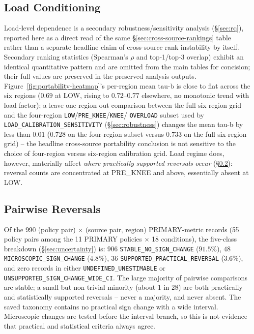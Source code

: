 \subsection{Load Conditioning}
\label{sec:load-conditioning}

Load-level dependence is a secondary robustness/sensitivity analysis
(\S\ref{sec:rq}), reported here as a direct read of the same
\S\ref{sec:cross-source-rankings} table rather than a separate headline
claim of cross-source rank instability by itself. Secondary ranking statistics (Spearman's $\rho$ and top-1/top-3 overlap) exhibit an identical quantitative pattern and are omitted from the main tables for concision; their full values are preserved in the preserved analysis outputs. Figure~\ref{fig:portability-heatmap}'s
per-region mean tau-b is close to flat across the six regions ($0.69$ at
LOW, rising to $0.72$--$0.77$ elsewhere, no monotonic trend with load
factor); a leave-one-region-out comparison between the full six-region
grid and the four-region \texttt{LOW}/\texttt{PRE\_KNEE}/\texttt{KNEE}/
\texttt{OVERLOAD} subset used by \texttt{LOAD\_CALIBRATION\_SENSITIVITY}
(\S\ref{sec:robustness}) changes the mean tau-b by less than $0.01$
($0.728$ on the four-region subset versus $0.733$ on the full six-region
grid) -- the headline cross-source portability conclusion is not sensitive
to the choice of four-region versus six-region calibration grid. Load
regime does, however, materially affect \emph{where practically supported
reversals occur} (\S\ref{sec:reversals}): reversal counts are concentrated
at PRE\_KNEE and above, essentially absent at LOW.

\subsection{Pairwise Reversals}
\label{sec:reversals}

Of the 990 (policy pair) $\times$ (source pair, region) PRIMARY-metric
records (55 policy pairs among the 11 PRIMARY policies $\times$ 18
conditions), the
five-class breakdown (\S\ref{sec:uncertainty}) is: $906$
\texttt{STABLE\_NO\_SIGN\_CHANGE} ($91.5\%$), $48$
\texttt{MICROSCOPIC\_SIGN\_CHANGE} ($4.8\%$), $36$
\texttt{SUPPORTED\_PRACTICAL\_REVERSAL} ($3.6\%$), and zero records in
either \texttt{UNDEFINED\_UNESTIMABLE} or
\texttt{UNSUPPORTED\_SIGN\_CHANGE\_WIDE\_CI}. The large majority of
pairwise comparisons are stable; a small but non-trivial minority (about 1
in 28) are both practically and statistically supported reversals -- never
a majority, and never absent. The saved taxonomy contains no practical sign change with a wide interval. Microscopic changes are tested before the interval branch, so this is not evidence that practical and statistical criteria always agree.




